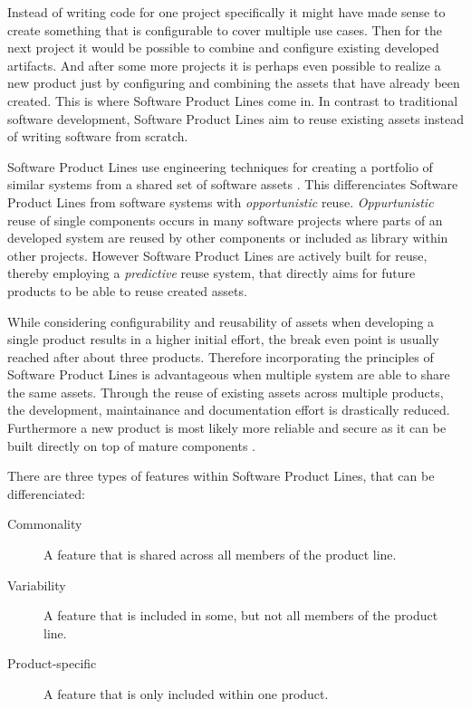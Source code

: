 \documentclass[a4paper]{article}
\begin{document}
Instead of writing code for one project specifically it might have made sense to create something that is configurable to cover multiple use cases. Then for the next project it would be possible to combine and configure existing developed artifacts. And after some more projects it is perhaps even possible to realize a new product just by configuring and combining the assets that have already been created. This is where Software Product Lines come in. In contrast to traditional software development, Software Product Lines aim to reuse existing assets instead of writing software from scratch.

Software Product Lines use engineering techniques for creating a portfolio of similar systems from a shared set of software assets \cite{intro-spl}. This differenciates Software Product Lines from software systems with \emph{opportunistic} reuse. \emph{Oppurtunistic} reuse of single components occurs in many software projects where parts of an developed system are reused by other components or included as library within other projects. However Software Product Lines are actively built for reuse, thereby employing a \emph{predictive} reuse system, that directly aims for future products to be able to reuse created assets.

While considering configurability and reusability of assets when developing a single product results in a higher initial effort, the break even point is usually reached after about three products. Therefore incorporating the principles of Software Product Lines is advantageous when multiple system are able to share the same assets. Through the reuse of existing assets across multiple products, the development, maintainance and documentation effort is drastically reduced. Furthermore a new product is most likely more reliable and secure as it can be built directly on top of mature components  \cite[p.4f]{spl-in-action}.

There are three types of features within Software Product Lines, that can be differenciated\cite[p.8]{spl-in-action}:
\begin{description}
\item[Commonality]  A feature that is shared across all members of the product line.
\item[Variability]  A feature that is included in some, but not all members of the product line.
\item[Product-specific]  A feature that is only included within one product. 
\end{description}
\end{document}
